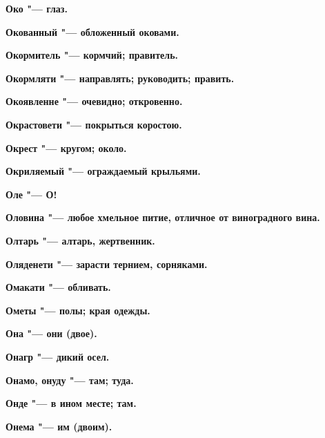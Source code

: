 \bfseries Око \normalfont{} "--- глаз. 




\bfseries Окованный \normalfont{} "--- обложенный оковами. 




\bfseries Окормитель \normalfont{} "--- кормчий; правитель. 




\bfseries Окормляти \normalfont{} "--- направлять; руководить; править. 




\bfseries Окоявленне \normalfont{} "--- очевидно; откровенно. 




\bfseries Окрастовети \normalfont{} "--- покрыться коростою. 




\bfseries Окрест \normalfont{} "--- кругом; около. 




\bfseries Окриляемый \normalfont{} "--- ограждаемый крыльями. 




\bfseries Оле \normalfont{} "--- О! 




\bfseries Оловина \normalfont{} "--- любое хмельное питие, отличное от виноградного вина. 




\bfseries Олтарь \normalfont{} "--- алтарь, жертвенник. 




\bfseries Оляденети \normalfont{} "--- зарасти тернием, сорняками. 




\bfseries Омакати \normalfont{} "--- обливать. 




\bfseries Ометы \normalfont{} "--- полы; края одежды. 




\bfseries Она \normalfont{} "--- они (двое). 




\bfseries Онагр \normalfont{} "--- дикий осел. 




\bfseries Онамо, онуду \normalfont{} "--- там; туда. 




\bfseries Онде \normalfont{} "--- в ином месте; там. 




\bfseries Онема \normalfont{} "--- им (двоим). 




